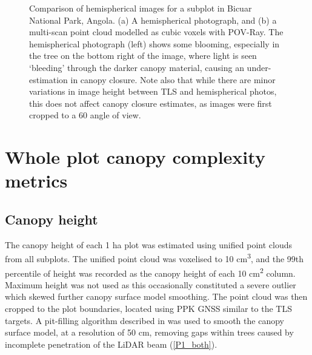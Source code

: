 \documentclass[11pt,a4paper]{article}
\begin{document}
\begin{figure}
\begin{subfigure}{0.45\linewidth}
		\caption{}
		\label{hemi_tls}
	\end{subfigure}
	\caption{Comparison of hemispherical images for a subplot in Bicuar National Park, Angola. (a) A hemispherical photograph, and (b) a multi-scan point cloud modelled as cubic voxels with POV-Ray. The hemispherical photograph (left) shows some blooming, especially in the tree on the bottom right of the image, where light is seen `bleeding' through the darker canopy material, causing an under-estimation in canopy closure. Note also that while there are minor variations in image height between TLS and hemispherical photos, this does not affect canopy closure estimates, as images were first cropped to a 60\textdegree{} angle of view.}
	\label{hemi_tls_ex}
\end{figure}

\section{Whole plot canopy complexity metrics}

\subsection{Canopy height}

The canopy height of each 1 ha plot was estimated using unified point clouds from all subplots. The unified point cloud was voxelised to 10 cm\textsuperscript{3}, and the 99th percentile of height was recorded as the canopy height of each 10 cm\textsuperscript{2} column. Maximum height was not used as this occasionally constituted a severe outlier which skewed further canopy surface model smoothing. The point cloud was then cropped to the plot boundaries, located using PPK GNSS similar to the TLS targets. A pit-filling algorithm described in \citet{Khosravipour2014} was used to smooth the canopy surface model, at a resolution of 50 cm, removing gaps within trees caused by incomplete penetration of the LiDAR beam (\autoref{P1_both}). 
\end{document}
